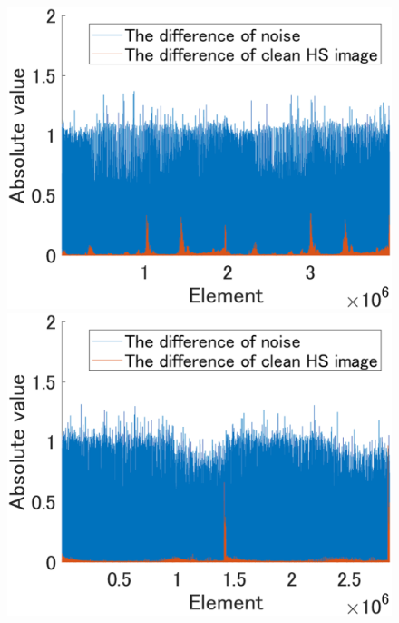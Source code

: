 \begin{figure}[t]
\begin{center}
		\begin{minipage}{0.320\hsize}
			\centerline{\includegraphics[width=\hsize]{./fig_supplement/compare_sparsity/JasperRidge_second_order_differences.eps}}
		\end{minipage}
		\begin{minipage}{0.320\hsize}
			\centerline{\includegraphics[width=\hsize]{./fig_supplement/compare_sparsity/PaviaU120_second_order_differences.eps}}
		\end{minipage}

\end{center}
\end{figure}
